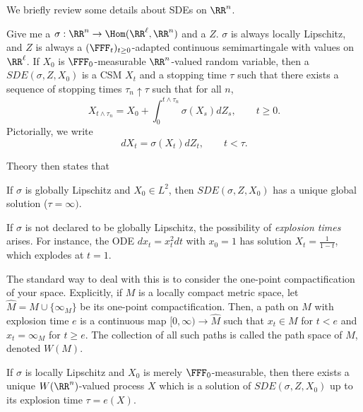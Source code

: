 \documentclass{scrartcl}
\begin{document}
We briefly review some details about SDEs on $\RR^n$.

Give me a  $\sigma:\RR^n\to \Hom(\RR^\ell, \RR^n)$ and a  $Z$. $\sigma$ is always locally Lipschitz, and $Z$ is always a $(\FFF_t)_{t\geq 0}$-adapted continuous semimartingale with values on $\RR^\ell$. If $X_0$ is $\FFF_0$-measurable $\RR^n$-valued random variable, then a  $SDE(\sigma, Z, X_0)$ is a CSM $X_t$ and a stopping time $\tau$ such that there exists a sequence of stopping times $\tau_n\uparrow \tau$ such that for all $n$,
\[
    X_{t\land \tau_n} = X_0 + \int_0^{t\land \tau_n} \sigma(X_s)dZ_s, \qquad t\geq 0.
\]
Pictorially, we write
\[
    dX_t = \sigma(X_t)dZ_t,\qquad t < \tau.
\]


Theory then states that
\begin{thm}
    If $\sigma$ is globally Lipschitz and $X_0\in L^2$, then $SDE(\sigma, Z, X_0)$ has a unique global solution ($\tau = \infty)$.
\end{thm}

If $\sigma$ is not declared to be globally Lipschitz, the possibility of \emph{explosion times} arises. For instance, the ODE $dx_t = x_t^2dt$ with $x_0 = 1$ has solution $X_t = \frac{1}{1-t}$, which explodes at $t = 1$.

The standard way to deal with this is to consider the one-point compactification of your space. Explicitly, if $M$ is a locally compact metric space, let $\hat{M} = M\cup \{\infty_M\}$ be its one-point compactification. Then, a path on $M$ with explosion time $e$ is a continuous map $[0,\infty)\to \hat{M}$ such that $x_t \in M$ for $t < e$ and $x_t = \infty_M$ for $t\geq e$. The collection of all such paths is called the path space of $M$, denoted $W(M)$.

\begin{thm}
    If $\sigma$ is locally Lipschitz and $X_0$ is merely $\FFF_0$-measurable, then there exists a unique $W(\RR^n)$-valued process $X$ which is a solution of $SDE(\sigma, Z, X_0)$ up to its explosion time $\tau = e(X)$.
\end{thm}
\end{document}
